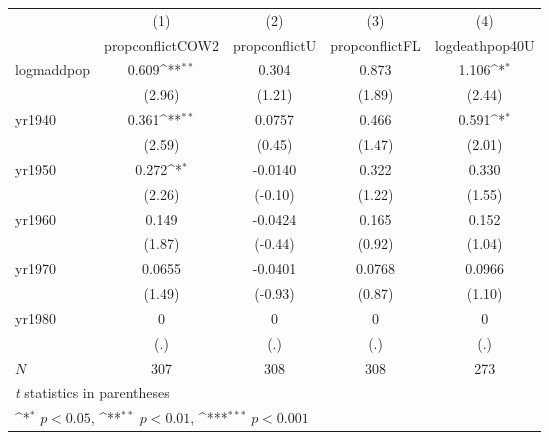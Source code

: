 {
\def\sym#1{\ifmmode^{#1}\else\(^{#1}\)\fi}
\begin{tabular}{l*{4}{c}}
\hline\hline
            &\multicolumn{1}{c}{(1)}&\multicolumn{1}{c}{(2)}&\multicolumn{1}{c}{(3)}&\multicolumn{1}{c}{(4)}\\
            &\multicolumn{1}{c}{propconflictCOW2}&\multicolumn{1}{c}{propconflictU}&\multicolumn{1}{c}{propconflictFL}&\multicolumn{1}{c}{logdeathpop40U}\\
\hline
logmaddpop  &       0.609\sym{**} &       0.304         &       0.873         &       1.106\sym{*}  \\
            &      (2.96)         &      (1.21)         &      (1.89)         &      (2.44)         \\
[1em]
yr1940      &       0.361\sym{**} &      0.0757         &       0.466         &       0.591\sym{*}  \\
            &      (2.59)         &      (0.45)         &      (1.47)         &      (2.01)         \\
[1em]
yr1950      &       0.272\sym{*}  &     -0.0140         &       0.322         &       0.330         \\
            &      (2.26)         &     (-0.10)         &      (1.22)         &      (1.55)         \\
[1em]
yr1960      &       0.149         &     -0.0424         &       0.165         &       0.152         \\
            &      (1.87)         &     (-0.44)         &      (0.92)         &      (1.04)         \\
[1em]
yr1970      &      0.0655         &     -0.0401         &      0.0768         &      0.0966         \\
            &      (1.49)         &     (-0.93)         &      (0.87)         &      (1.10)         \\
[1em]
yr1980      &           0         &           0         &           0         &           0         \\
            &         (.)         &         (.)         &         (.)         &         (.)         \\
\hline
\(N\)       &         307         &         308         &         308         &         273         \\
\hline\hline
\multicolumn{5}{l}{\footnotesize \textit{t} statistics in parentheses}\\
\multicolumn{5}{l}{\footnotesize \sym{*} \(p<0.05\), \sym{**} \(p<0.01\), \sym{***} \(p<0.001\)}\\
\end{tabular}
}
